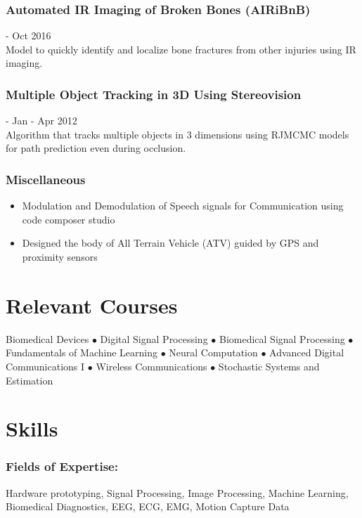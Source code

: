 \documentclass{article}
\begin{document}
 \subsubsection{Automated IR Imaging of Broken Bones (AIRiBnB)} \hfill - Oct 2016\\
Model to quickly identify and localize bone fractures from other injuries using IR imaging.\\
    
\subsubsection{Multiple Object Tracking in 3D Using Stereovision} \hfill - Jan - Apr 2012\\
Algorithm that tracks multiple objects in 3 dimensions using RJMCMC models for path prediction even during occlusion.\\
    
\subsubsection{Miscellaneous}
\begin{itemize}
    \item Modulation and Demodulation of Speech signals for Communication using code composer studio 
    \item Designed the body of All Terrain Vehicle (ATV) guided by GPS and proximity sensors  
\end{itemize}


\section{Relevant Courses}
Biomedical Devices $\bullet$ Digital Signal Processing $\bullet$ Biomedical Signal Processing $\bullet$ Fundamentals of Machine Learning $\bullet$ Neural Computation   $\bullet$ Advanced Digital Communications I $\bullet$ Wireless Communications $\bullet$ Stochastic Systems and Estimation


\section{Skills}
\subsubsection{Fields of Expertise:} 
Hardware prototyping, Signal Processing, Image Processing, Machine Learning, Biomedical Diagnostics, EEG, ECG, EMG, Motion Capture Data
\end{document}
